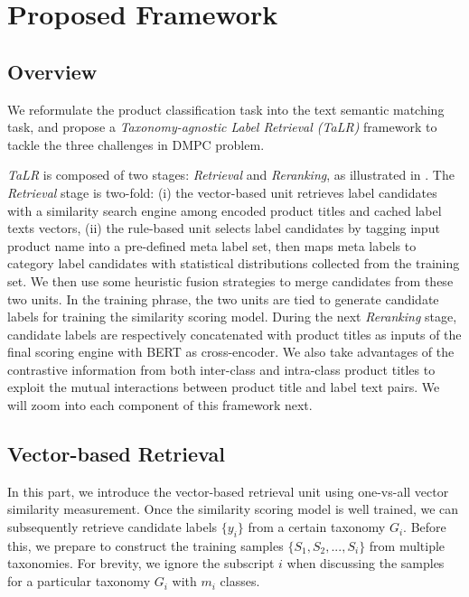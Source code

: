 \section{Proposed Framework}
\subsection{Overview}
We reformulate the product classification task into the text semantic matching task, and propose a \textit{Taxonomy-agnostic Label Retrieval (TaLR)} framework to tackle the three challenges in DMPC problem.


\textit{TaLR} is composed of two stages: \textit{Retrieval} and \textit{Reranking}, as illustrated in . The \textit{Retrieval} stage is two-fold: (i) the vector-based unit retrieves label candidates with a  similarity search engine among encoded product titles and cached label texts vectors, (ii) the rule-based unit selects label candidates by tagging input product name into a pre-defined meta label set, then maps meta labels to category label candidates with statistical distributions collected from the training set. We then use some heuristic fusion strategies to merge candidates from these two units. In the training phrase, the two units are tied to generate candidate labels for training the similarity scoring model. During the next \textit{Reranking} stage, candidate labels are respectively concatenated with product titles as inputs of the final scoring engine with BERT as cross-encoder. 
We also take advantages of the contrastive information from both inter-class and intra-class product titles to exploit the mutual interactions between product title and label text pairs. We will zoom into each component of this framework next.

\subsection{Vector-based Retrieval}
In this part, we introduce the vector-based retrieval unit using one-vs-all vector similarity measurement. Once the similarity scoring model is well trained, we can subsequently retrieve candidate labels $\{y_i\}$ from a certain taxonomy $G_i$. Before this, we prepare to construct the training samples $\{S_1, S_2,...,S_i\}$ from multiple taxonomies. For brevity, we ignore the subscript $i$ when discussing the samples for a particular taxonomy $G_i$ with $m_i$ classes.
